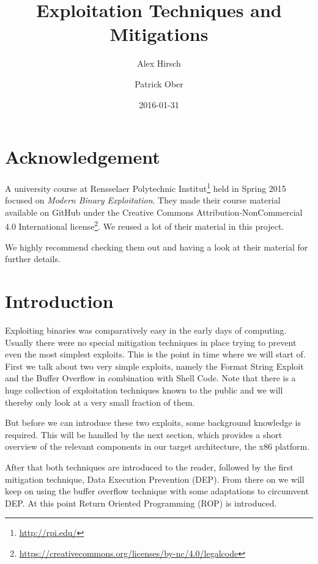 \documentclass[article]{uibk}
\title{Exploitation Techniques and Mitigations}
\author{Alex Hirsch \and Patrick Ober}
\date{2016-01-31}
\begin{document}
%
%
%

\section*{Acknowledgement}

A university course at Rensselaer Polytechnic
Institut\footnote{\url{http://rpi.edu/}} held in Spring 2015 focused on
\textit{Modern Binary Exploitation}. They made their course material available
on GitHub \cite{RPISEC} under the Creative Commons Attribution-NonCommercial
4.0 International
license\footnote{\url{https://creativecommons.org/licenses/by-nc/4.0/legalcode}}.
We reused a lot of their material in this project.

We highly recommend checking them out and having a look at their material for
further details.

\section{Introduction}

Exploiting binaries was comparatively easy in the early days of computing.
Usually there were no special mitigation techniques in place trying to prevent
even the most simplest exploits. This is the point in time where we will start
of. First we talk about two very simple exploits, namely the Format String
Exploit and the Buffer Overflow in combination with Shell Code. Note that there
is a huge collection of exploitation techniques known to the public and we will
thereby only look at a very small fraction of them.

But before we can introduce these two exploits, some background knowledge is
required. This will be handled by the next section, which provides a short
overview of the relevant components in our target architecture, the x86
platform.

After that both techniques are introduced to the reader, followed by the first
mitigation technique, Data Execution Prevention (DEP). From there on we will
keep on using the buffer overflow technique with some adaptations to circumvent
DEP. At this point Return Oriented Programming (ROP) is introduced.
\end{document}
